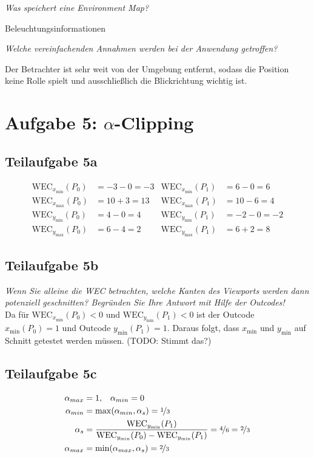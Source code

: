 \documentclass[a4paper]{scrartcl}
\begin{document}
\textit{Was speichert eine Environment Map?}

Beleuchtungsinformationen

\textit{Welche vereinfachenden Annahmen werden bei der Anwendung getroffen?}

Der Betrachter ist sehr weit von der Umgebung entfernt, sodass die Position
keine Rolle spielt und ausschließlich die Blickrichtung wichtig ist.


\section*{Aufgabe 5: $\alpha$-Clipping}
\subsection*{Teilaufgabe 5a}

\begin{align}
    \text{WEC}_{x_\text{min}}(P_0) &= -3-0 =-3 & \text{WEC}_{x_\text{min}}(P_1) &= 6-0 =6\\
    \text{WEC}_{x_\text{max}}(P_0) &= 10+3 =13 & \text{WEC}_{x_\text{max}}(P_1) &= 10-6 =4\\
    \text{WEC}_{y_\text{min}}(P_0) &= 4-0 = 4 & \text{WEC}_{y_\text{min}}(P_1) &= -2-0 =-2\\
    \text{WEC}_{y_\text{max}}(P_0) &= 6-4 = 2 & \text{WEC}_{y_\text{max}}(P_1) &= 6+2 =8
\end{align}

\goodbreak
\subsection*{Teilaufgabe 5b}
\textit{Wenn Sie alleine die WEC betrachten, welche Kanten des Viewports werden dann potenziell geschnitten? Begründen Sie Ihre Antwort mit Hilfe der Outcodes!}\\
Da für $\text{WEC}_{x_\text{min}}(P_0) < 0$ und $\text{WEC}_{y_\text{min}}(P_1) < 0$
ist der Outcode $x_\text{min}(P_0) = 1$ und Outcode $y_\text{min}(P_1) = 1$.
Daraus folgt, dass $x_\text{min}$ und $y_\text{min}$ auf Schnitt getestet
werden müssen. (TODO: Stimmt das?)

\subsection*{Teilaufgabe 5c}
\begin{align}
    \alpha_{max} &= 1,\;\;\; \alpha_{min} = 0\\
    \alpha_{min} &= \max(\alpha_{min}, \alpha_s) = \nicefrac{1}{3}\\
    \alpha_s &= \frac{\text{WEC}_{y_\text{min}}(P_1)}{\text{WEC}_{y_\text{min}}(P_0) - \text{WEC}_{y_\text{min}}(P_1)} = \nicefrac{4}{6} = \nicefrac{2}{3}\\
    \alpha_{max} &= \min(\alpha_{max}, \alpha_s) = \nicefrac{2}{3}
\end{align}
\end{document}
